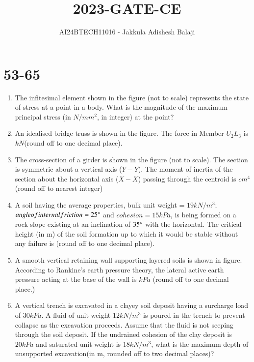 \documentclass[journal]{IEEEtran}
\begin{document}

\title{2023-GATE-CE}
\author{AI24BTECH11016 - Jakkula Adishesh Balaji}
{\let\newpage\relax\maketitle}

\renewcommand{\thefigure}{\theenumi}
\renewcommand{\thetable}{\theenumi}
\setlength{\intextsep}{10pt} %
\section{53-65}
\begin{enumerate}
	\item
	The infitesimal element shown in the figure (not to scale) represents the state of stress at a point in a body. What is the magnitude of the maximum principal stress (in $N/mm^{2}$, in integer) at the point?
	\item
	An idealised bridge truss is shown in the figure. The force in Member $U_{2}L_{3}$ is $kN$(round off to one decimal place).
	\item 
	The cross-section of a girder is shown in the figure (not to scale). The section is symmetric about a vertical axis ($Y-Y$). The moment of inertia of the section about the horizontal axis ($X-X$) passing through the centroid is $cm^{4}$ (round off to nearest integer)
	\item
	A soil having the average properties, bulk unit weight = $19 kN/m^{3}$; $angle of internal friction = 25 \degree $ and $cohesion = 15 kPa$, is being formed on a rock slope existing at an inclination of $35 \degree $ with the horizontal. The critical height (in m) of the soil formation up to which it would be stable without any failure is (round off to one decimal place).
	\\
	\item
	A smooth vertical retaining wall supporting layered soils is shown in figure. According to Rankine's earth pressure theory, the lateral active earth pressure acting at the base of the wall is $kPa$ (round off to one decimal place.)
	\item
	A vertical trench is excavated in a clayey soil deposit having a surcharge load of $30 kPa$. A fluid of unit weight $12 kN/m^{3}$ is poured in the trench to prevent collapse as the excavation proceeds. Assume that the fluid is not seeping through the soil deposit. If the undrained cohesion of the clay deposit is $20 kPa$ and saturated unit weight is $18 kN/m^{3}$, what is the maximum depth of unsupported excavation(in m, rounded off to two decimal places)?

\end{enumerate}
\end{document}
